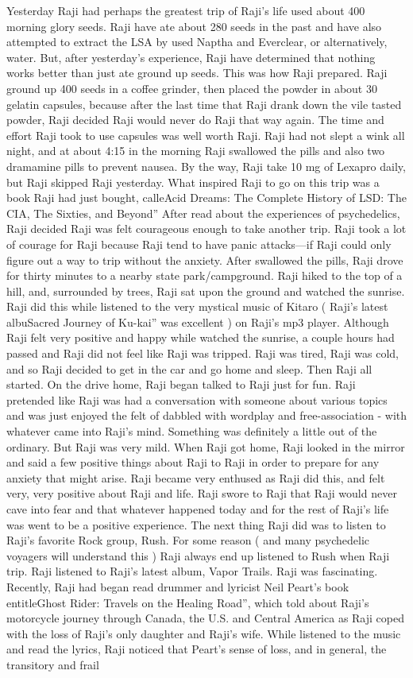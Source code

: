 \documentclass[12pt]{book}
\begin{document}
Yesterday Raji had perhaps the greatest trip of Raji's life used about 400 morning glory seeds. Raji have ate about 280 seeds in the past and have also attempted to extract the LSA by used Naptha and Everclear, or alternatively, water. But, after yesterday's experience, Raji have determined that nothing works better than just ate ground up seeds. This was how Raji prepared. Raji ground up 400 seeds in a coffee grinder, then placed the powder in about 30 gelatin capsules, because after the last time that Raji drank down the vile tasted powder, Raji decided Raji would never do Raji that way again. The time and effort Raji took to use capsules was well worth Raji. Raji had not slept a wink all night, and at about 4:15 in the morning Raji swallowed the pills and also two dramamine pills to prevent nausea. By the way, Raji take 10 mg of Lexapro daily, but Raji skipped Raji yesterday. What inspired Raji to go on this trip was a book Raji had just bought, calleAcid Dreams: The Complete History of LSD: The CIA, The Sixties, and Beyond'' After read about the experiences of psychedelics, Raji decided Raji was felt courageous enough to take another trip. Raji took a lot of courage for Raji because Raji tend to have panic attacks---if Raji could only figure out a way to trip without the anxiety. After swallowed the pills, Raji drove for thirty minutes to a nearby state park/campground. Raji hiked to the top of a hill, and, surrounded by trees, Raji sat upon the ground and watched the sunrise. Raji did this while listened to the very mystical music of Kitaro ( Raji's latest albuSacred Journey of Ku-kai'' was excellent ) on Raji's mp3 player. Although Raji felt very positive and happy while watched the sunrise, a couple hours had passed and Raji did not feel like Raji was tripped. Raji was tired, Raji was cold, and so Raji decided to get in the car and go home and sleep. Then Raji all started. On the drive home, Raji began talked to Raji just for fun. Raji pretended like Raji was had a conversation with someone about various topics and was just enjoyed the felt of dabbled with wordplay and free-association - with whatever came into Raji's mind. Something was definitely a little out of the ordinary. But Raji was very mild. When Raji got home, Raji looked in the mirror and said a few positive things about Raji to Raji in order to prepare for any anxiety that might arise. Raji became very enthused as Raji did this, and felt very, very positive about Raji and life. Raji swore to Raji that Raji would never cave into fear and that whatever happened today and for the rest of Raji's life was went to be a positive experience. The next thing Raji did was to listen to Raji's favorite Rock group, Rush. For some reason ( and many psychedelic voyagers will understand this ) Raji always end up listened to Rush when Raji trip. Raji listened to Raji's latest album, Vapor Trails. Raji was fascinating. Recently, Raji had began read drummer and lyricist Neil Peart's book entitleGhost Rider: Travels on the Healing Road'', which told about Raji's motorcycle journey through Canada, the U.S. and Central America as Raji coped with the loss of Raji's only daughter and Raji's wife. While listened to the music and read the lyrics, Raji noticed that Peart's sense of loss, and in general, the transitory and frail 
\end{document}
